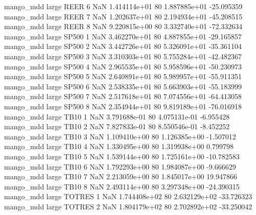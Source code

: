         mango_mdd      large     REER                 6                  NaN 1.414114e+01 80   1.887885e+01         -25.095359
        mango_mdd      large     REER                 7                  NaN 1.202637e+01 80   2.194934e+01         -45.208515
        mango_mdd      large     REER                 8                  NaN 9.220815e+00 80   3.332740e+01         -72.332634
        mango_mdd      large    SP500                 1                  NaN 3.462270e+01 80   4.887855e+01         -29.165857
        mango_mdd      large    SP500                 2                  NaN 3.442726e+01 80   5.326091e+01         -35.361104
        mango_mdd      large    SP500                 3                  NaN 3.310303e+01 80   5.755284e+01         -42.482367
        mango_mdd      large    SP500                 4                  NaN 2.965535e+01 80   5.958596e+01         -50.230973
        mango_mdd      large    SP500                 5                  NaN 2.640891e+01 80   5.989957e+01         -55.911351
        mango_mdd      large    SP500                 6                  NaN 2.538335e+01 80   5.663903e+01         -55.183999
        mango_mdd      large    SP500                 7                  NaN 2.517618e+01 80   7.074556e+01         -64.413058
        mango_mdd      large    SP500                 8                  NaN 2.354944e+01 80   9.819189e+01         -76.016918
        mango_mdd      large     TB10                 1                  NaN 3.791688e-01 80   4.075131e-01          -6.955428
        mango_mdd      large     TB10                 2                  NaN 7.827833e-01 80   8.550546e-01          -8.452252
        mango_mdd      large     TB10                 3                  NaN 1.109410e+00 80   1.126385e+00          -1.507012
        mango_mdd      large     TB10                 4                  NaN 1.330495e+00 80   1.319938e+00           0.799798
        mango_mdd      large     TB10                 5                  NaN 1.539144e+00 80   1.725161e+00         -10.782583
        mango_mdd      large     TB10                 6                  NaN 1.792293e+00 80   1.984087e+00          -9.666629
        mango_mdd      large     TB10                 7                  NaN 2.213059e+00 80   1.845017e+00          19.947866
        mango_mdd      large     TB10                 8                  NaN 2.493114e+00 80   3.297348e+00         -24.390315
        mango_mdd      large   TOTRES                 1                  NaN 1.744408e+02 80   2.632129e+02         -33.726323
        mango_mdd      large   TOTRES                 2                  NaN 1.804179e+02 80   2.702892e+02         -33.250042
